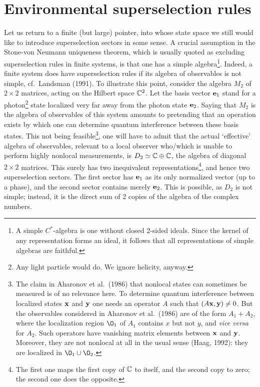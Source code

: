 \documentclass[12pt,titlepage]{article}
\newcommand{\fn}{\footnote}
\renewcommand{\sp}{\samepage}
\begin{document}
\section{Environmental superselection rules}
Let us return to a finite (but large) pointer, into whose state space we still
would like to
introduce superselection sectors in some sense. A crucial assumption in  the
Stone-von Neumann
uniqueness theorem, which is usually quoted as excluding superselection rules
in finite systems, is
that one has a simple algebra\fn{A simple $C^*$-algebra is one without closed
2-sided ideals. Since
the kernel of any representation forms an ideal, it follows that all
representations of simple
algebras are faithful.}. Indeed, a finite system does have superselection rules
if its algebra of
observables is not simple,  cf.\ Landsman (1991). To illustrate this point,
consider the algebra
$M_2$ of $2\times 2$ matrices, acting on the Hilbert space ${\Bbb C}^2$. Let
the basis vector ${\bf
e}_1$  stand for a photon\fn{Any light particle would do. We ignore helicity,
anyway.} state
localized very far away from the photon state ${\bf e}_2$. Saying that $M_2$ is
the algebra of
observables of this system amounts to pretending that an operation exists by
which one can determine
quantum interference between these basis states. This not being feasible\fn{
{\sp The claim in
Aharonov et al.\ (1986) that nonlocal states can sometimes be measured is of no
relevance here. To
determine  quantum interference between localized states $\bf x$ and $\bf y$
one needs an operator
$A$ such that $(A{\bf x},{\bf y})\neq 0$. But the observables considered in
Aharonov et al.\ (1986)
are of the form $A_1+A_2$, where  the localization region $\O_1$ of $A_1$
contains $x$ but not $y$,
and {\em vice versa} for $A_2$. Such operators have vanishing matrix elements
between $\bf x$ and
$\bf y$. Moreover, they are not nonlocal at all in the usual sense (Haag,
1992): they are localized in
$\O_1\cup \O_2$.}},
 one
will have to admit that the actual `effective' algebra of observables, relevant
to a local observer
who/which is unable to perform highly nonlocal measurements, is $D_2\simeq
{\Bbb C}\oplus {\Bbb C}$,
the algebra of diagonal $2\times 2$ matrices. This surely has two inequivalent
representations\fn{The first one maps the first copy of $\Bbb C$ to itself, and
the second copy to
zero; the second one does the opposite.}, and hence two superselection sectors.
The first sector
has ${\bf e}_1$ as its only normalized vector (up to a phase), and the second
sector contains merely
${\bf e}_2$.  This is possible, as $D_2$ is not simple; instead, it is the
direct sum of 2 copies of the algebra of the complex numbers.
\end{document}

